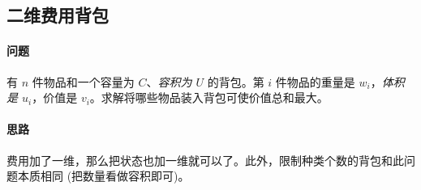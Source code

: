 \subsection{二维费用背包}
	\paragraph{问题} 有 $n$ 件物品和一个容量为 $C$、\emph{容积为 $U$} 的背包。第 $i$ 件物品的重量是 $w_i$，\emph{体积是 $u_i$}，价值是 $v_i$。求解将哪些物品装入背包可使价值总和最大。

	\paragraph{思路} 费用加了一维，那么把状态也加一维就可以了。此外，限制种类个数的背包和此问题本质相同 (把数量看做容积即可)。
